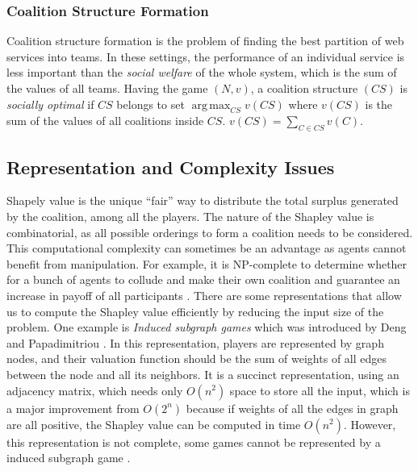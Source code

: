             \subsubsection*{Coalition Structure Formation}\label{sec:coalition}

            Coalition structure formation is the problem of finding the best
            partition of web services into teams. In these settings, the
            performance of an individual service is less important than the
            \emph{social welfare} of the whole system, which is the sum of the
            values of all teams. Having the game $(N,v)$, a coalition
            structure $(CS)$ is \emph{socially optimal} if $CS$ belongs to set
            $\operatorname*{arg\,max}_{CS} v(CS)$ where $v(CS)$ is the sum of
            the values of all coalitions inside $CS$. $v(CS) = \sum_{C \in
            CS}v(C)$.


        \subsection{Representation and Complexity Issues}\label{sec:CWSArchitecture}

        Shapely value is the unique ``fair'' way to distribute the total surplus generated by the coalition, among all the players.
        The nature of the Shapley value is combinatorial, as all possible orderings to form a
        coalition needs to be considered. This computational complexity can sometimes be
        an advantage as agents cannot benefit from manipulation. For example, it is NP-complete
        to determine whether for a bunch of agents to collude and make their own coalition and guarantee
        an increase in payoff of all participants \cite{conf/aaai/YokooCSOI05}.
        There are some representations that allow us to compute the Shapley value efficiently by reducing the input size of the problem.
        One example is \emph{Induced subgraph games}
        which was introduced by Deng and Papadimitriou \cite{Deng94}. In this representation, players are represented by graph nodes, and
        their valuation function should be the sum of weights of all edges between the node and all its neighbors. It is a succinct representation, using
        an adjacency matrix, which needs only $O(n^2)$ space to store all the input, which is a major improvement from $O(2^n)$ because
        if weights of all the edges in graph are all positive, the Shapley value can be computed in time $O(n^2)$.
        However, this representation is not complete, some games cannot be represented by a induced subgraph game \cite{conf/aaai/YokooCSOI05}.

